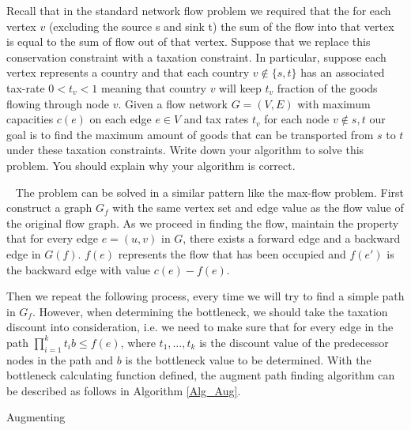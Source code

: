 \begin{exercise}[]{Recall that in the standard network flow problem we required that the for each vertex $v$ (excluding the source s and sink t) the sum of the flow into that vertex is equal to the sum of flow out of that vertex. Suppose that we replace this conservation constraint with a taxation constraint. In particular, suppose each vertex represents a country and that each country $v \notin  \{s, t\}$ has an associated tax-rate $0 < t_v < 1$ meaning that country $v$ will keep
    $t_v$ fraction of the goods flowing through node $v$. Given a flow network $G = (V, E)$ with maximum capacities $c(e)$ on each edge $e \in V$ and tax rates $t_v$ for each node $v \notin {s, t}$ our goal is to find the maximum amount of goods that can be transported from $s$ to $t$ under these taxation constraints. Write down your algorithm to solve this problem. You should explain why your algorithm is correct. }
  \begin{solution}
  \par{~}
  The problem can be solved in a similar pattern like the max-flow problem. First construct a graph $G_f$ with the same vertex set and edge value as the flow value of the original flow graph. As we proceed in finding the flow, maintain the property that for every edge $e=(u,v)$ in $G$, there exists a forward edge and a backward edge in $G(f)$. $f(e)$ represents the flow that has been occupied and $f(e')$ is the backward edge with value $c(e) - f(e)$.

  Then we repeat the following process, every time we will try to find a simple path in $G_f$. However, when determining the bottleneck, we should take the taxation discount into consideration, i.e. we need to make sure that for every edge in the path $\prod_{i=1}^{k}t_i b \le f(e)$, where $t_1,\ldots,t_k$ is the discount value of the predecessor nodes in the path and $b$ is the bottleneck value to be determined. With the bottleneck calculating function defined, the augment path finding algorithm can be described as follows in Algorithm \ref{Alg_Aug}.

  \begin{algorithm}[H]

    \BlankLine
    \caption{Augmenting}\label{Alg_Aug}


\end{algorithm}
\end{solution}
\end{exercise}
